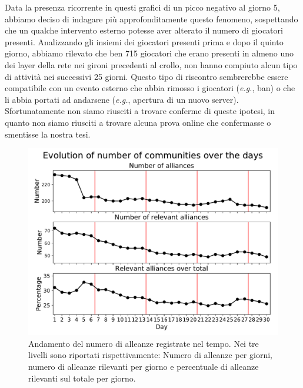 Data la presenza ricorrente in questi grafici di un picco negativo al giorno 5, abbiamo deciso di indagare più approfonditamente questo fenomeno, sospettando che un qualche intervento esterno potesse aver alterato il numero di giocatori presenti. Analizzando gli insiemi dei giocatori presenti prima e dopo il quinto giorno, abbiamo rilevato che ben 715 giocatori che erano presenti in almeno uno dei layer della rete nei gironi precedenti al crollo, non hanno compiuto alcun tipo di attività nei successivi 25 giorni. Questo tipo di riscontro sembrerebbe essere compatibile con un evento esterno che abbia rimosso i giocatori (\textit{e.g.}, ban) o che li abbia portati ad andarsene (\textit{e.g.}, apertura di un nuovo server). Sfortunatamente non siamo riusciti a trovare conferme di queste ipotesi, in quanto non siamo riusciti a trovare alcuna prova online che confermasse o smentisse la nostra tesi.
\begin{figure}
	\centering
	\includegraphics[width=0.85\linewidth]{images/alliances_each_day}
	\caption{Andamento del numero di alleanze registrate nel tempo. Nei tre livelli sono riportati rispettivamente: Numero di alleanze per giorni, numero di alleanze rilevanti per giorno e percentuale di alleanze rilevanti sul totale per giorno.}
	\label{fig:allianceseachday}
\end{figure}

\newpage
